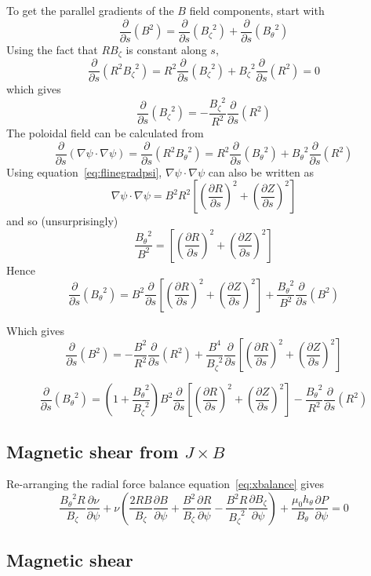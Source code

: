 \documentclass[12pt]{article}
\newcommand{\deriv}[2]{\ensuremath{\frac{\partial #1}{\partial #2}}}
\newcommand{\hthe}{\ensuremath{h_\theta}}
\newcommand{\Bp}{\ensuremath{B_\theta}}
\newcommand{\Bt}{\ensuremath{B_\zeta}}
\begin{document}
To get the parallel gradients of the $B$ field components, start with
\[
\deriv{}{s}\left(B^2\right) = \deriv{}{s}\left(\Bt^2\right) + \deriv{}{s}\left(\Bp^2\right)
\]
Using the fact that $R\Bt$ is constant along $s$,
\[
\deriv{}{s}\left(R^2\Bt^2\right) = R^2\deriv{}{s}\left(\Bt^2\right) + \Bt^2\deriv{}{s}\left(R^2\right) = 0
\]
which gives
\begin{equation}
  \deriv{}{s}\left(\Bt^2\right) = -\frac{\Bt^2}{R^2}\deriv{}{s}\left(R^2\right)
  \label{eq:dbtds}
\end{equation}
The poloidal field can be calculated from
\[
\deriv{}{s}\left(\nabla\psi \cdot \nabla\psi\right) = \deriv{}{s}\left(R^2\Bp^2\right) = R^2\deriv{}{s}\left(\Bp^2\right) + \Bp^2\deriv{}{s}\left(R^2\right)
\]
Using equation~\ref{eq:flinegradpsi}, $\nabla\psi \cdot \nabla\psi$ can also be written as
\[
\nabla\psi \cdot \nabla\psi = B^2R^2\left[\left(\deriv{R}{s}\right)^2 + \left(\deriv{Z}{s}\right)^2\right]
\]
and so (unsurprisingly)
\[
\frac{\Bp^2}{B^2} = \left[\left(\deriv{R}{s}\right)^2 + \left(\deriv{Z}{s}\right)^2\right]
\]
Hence
\[
\deriv{}{s}\left(\Bp^2\right) = B^2\deriv{}{s}\left[\left(\deriv{R}{s}\right)^2 + \left(\deriv{Z}{s}\right)^2\right] + \frac{\Bp^2}{B^2}\deriv{}{s}\left(B^2\right)
\]

Which gives
\begin{equation}
\deriv{}{s}\left(B^2\right) = -\frac{B^2}{R^2}\deriv{}{s}\left(R^2\right) + \frac{B^4}{\Bt^2}\deriv{}{s}\left[\left(\deriv{R}{s}\right)^2 + \left(\deriv{Z}{s}\right)^2\right]
\end{equation}

\begin{equation}
\deriv{}{s}\left(\Bp^2\right) = \left(1 + \frac{\Bp^2}{\Bt^2}\right)B^2\deriv{}{s}\left[\left(\deriv{R}{s}\right)^2 + \left(\deriv{Z}{s}\right)^2\right] - \frac{\Bp^2}{R^2}\deriv{}{s}\left(R^2\right)
\end{equation}

\subsection{Magnetic shear from $J\times B$}

Re-arranging the radial force balance equation~\ref{eq:xbalance} gives
\[
\frac{\Bp^2R}{\Bt}\deriv{\nu}{\psi} + \nu\left(\frac{2RB}{\Bt}\deriv{B}{\psi} + \frac{B^2}{\Bt}\deriv{R}{\psi} - \frac{B^2R}{\Bt^2}\deriv{\Bt}{\psi}\right) + \frac{\mu_0\hthe}{\Bp}\deriv{P}{\psi} = 0
\]

\subsection{Magnetic shear}
\end{document}
